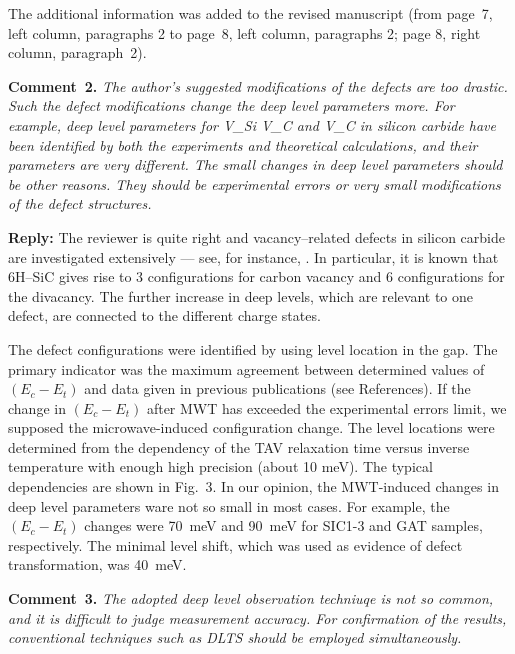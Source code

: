\documentclass[10pt]{iopart}
\begin{document}
The additional information was added to the revised manuscript
(from page~7, left column, paragraphs 2 to page~8, left column, paragraphs 2; 
page 8, right column, paragraph~2).


\vspace{1cm}
\noindent
\textcolor[rgb]{0.00,0.50,1.00}{\textbf{Comment~2.}}
\emph{The author's suggested modifications of the defects are too drastic.
Such the defect modifications change the deep level parameters more.
For example, deep level parameters for V\_Si V\_C and V\_C in silicon carbide have been
identified by both the experiments and theoretical calculations,
and their parameters are very different.
The small changes in deep level parameters should be other reasons.
They should be experimental errors or very small modifications of the defect structures.}

\noindent
\textcolor[rgb]{0.51,0.00,0.00}{\textbf{Reply:}}
The reviewer is quite right and vacancy--related defects in silicon carbide are investigated extensively ---
see, for instance, \cite{6HSiC:Vsi,4HSiC:Vc,6HSiC:VV2019,4HSiC:Vacan,SiC:defEPR,6HSiC:VPAS,4HSiC:VV,SiC:bookCh6,
6HSiC:Vsi2021,6HSiC:vac2021,4HSiC:NV,SiC:NV}.
In particular, it is known \cite{6HSiC:VV2019} that
6H--SiC gives rise to 3 configurations for carbon vacancy
and 6 configurations for the divacancy.
The further increase in deep levels, which are relevant to one defect, are connected to the different charge states.

The defect configurations were identified by using level location in the gap.
The primary indicator was the maximum agreement between determined values of $(E_c-E_t)$ and data given in
previous publications (see References).
If the change in $(E_c-E_t)$ after MWT has exceeded the experimental errors limit,
we supposed the microwave-induced configuration change.
The level locations were determined from the dependency of the TAV relaxation time
versus inverse temperature with enough high precision  (about 10 meV).
The typical dependencies are shown in Fig.~3.
In our opinion, the MWT-induced changes in deep level parameters ware not so small in most cases.
For example, the $(E_c-E_t)$ changes were 70~meV and 90~meV for SIC1-3 and GAT samples, respectively.
The minimal level shift, which was used as evidence of defect transformation, was 40~meV.





\vspace{1cm}
\noindent
\textcolor[rgb]{0.00,0.50,1.00}{\textbf{Comment~3.}}
\emph{The adopted deep level observation techniuqe is not so common,
and it is difficult to judge measurement accuracy.
For confirmation of the results, conventional techniques such as DLTS should be employed simultaneously.}
\end{document}

